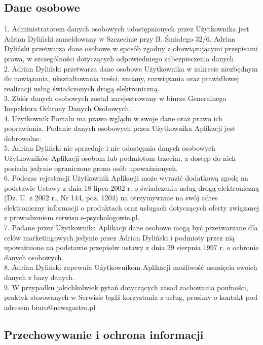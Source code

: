 \documentclass[12pt,leqno, twoside]{mwart}
\begin{document}
\subsection{Dane osobowe}
1. Administratorem danych osobowych udostępnionych przez Użytkownika jest 
Adrian Dyliński zameldowany w Szczecinie przy B. Śmiałego 32/6. Adrian Dyliński przetwarza dane osobowe w sposób zgodny z obowiązującymi przepisami prawa, w szczególności dotyczących odpowiedniego zabezpieczenia danych. \\
2. Adrian Dyliński przetwarza dane osobowe Użytkownika w zakresie niezbędnym do nawiązania, ukształtowania treści, zmiany, rozwiązania oraz prawidłowej realizacji usług świadczonych drogą elektroniczną. \\
3. Zbiór danych osobowych został zarejestrowany w biurze Generalnego Inspektora Ochrony Danych Osobowych. \\
4. Użytkownik Portalu ma prawo wglądu w swoje dane oraz prawo ich poprawiania. Podanie danych osobowych przez Użytkownika Aplikacji jest dobrowolne. \\
5. Adrian Dyliński nie sprzedaje i nie udostępnia danych osobowych Użytkowników Aplikacji osobom lub podmiotom trzecim, a dostęp do nich posiada jedynie ograniczone grono osób upoważnionych.  \\
6. Podczas rejestracji Użytkownik Aplikacji może wyrazić dodatkową zgodę na podstawie Ustawy z dnia 18 lipca 2002 r. o świadczeniu usług drogą elektroniczną (Dz. U. z 2002 r., Nr 144, poz. 1204) na otrzymywanie na swój adres elektroniczny informacji o produktach oraz usługach dotyczących oferty związanej z prowadzeniem serwisu e-psychologowie.pl. \\
7. Podane przez Użytkownika Aplikacji dane osobowe mogą być przetwarzane dla celów marketingowych jedynie przez Adrian Dyliński i podmioty przez nią upoważnione na podstawie przepisów ustawy z dnia 29 sierpnia 1997 r. o ochronie danych osobowych. \\
8. Adrian Dyliński zapewnia Użytkownikom Aplikacji możliwość usunięcia swoich danych z bazy danych.  \\
9. W przypadku jakichkolwiek pytań dotyczących zasad zachowania poufności, praktyk stosowanych w Serwisie bądź korzystania z usług, prosimy o kontakt pod adresem biuro@newsgastro.pl

\subsection{Przechowywanie i ochrona informacji}
\end{document}
